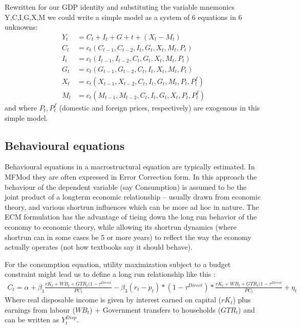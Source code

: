 \documentclass[letterpaper,10pt,english]{jupyterBook}
\begin{document}
\sphinxAtStartPar
Rewritten for our GDP identity and substituting the variable mnemonics Y,C,I,G,X,M we could write a simple model as a system of 6 equations in 6 unknowns:
\begin{align*}
Y_t  &=  C_t+I_t+G+t+ (X_t-M_t) \\
C_t &= c_t(C_{t-1},C_{t-2},I_t,G_t,X_t,M_t,P_t)\\
I_t &= c_t(I_{t-1},I_{t-2},C_t,G_t,X_t,M_t,P_t)\\
G_t &= c_t(G_{t-1},G_{t-2},C_t,I_t,X_t,M_t,P_t)\\
X_t &= c_t(X_{t-1},X_{t-2},C_t,I_t,G_t,M_t,P_t,P^f_t)\\
M_t &= c_t(M_{t-1},M_{t-2},C_t,I_t,G_t,X_t,P_t,P^f_t)
\end{align*}
\sphinxAtStartPar
and where \(P_t, P^f_t\) (domestic and foreign prices, respectively) are exogenous in this simple model.


\subsection{Behavioural equations}
\label{\detokenize{content/02_MacrostructuralModels/MacroStructuralModels:behavioural-equations}}
\sphinxAtStartPar
Behavioural equations in a macrostructural equation are typically estimated. In MFMod they are often expressed in Error Correction form. In this approach the behaviour of the dependent variable (say Consumption) is assumed to be the joint product of a long\sphinxhyphen{}term economic relationship – usually drawn from economic theory, and various short\sphinxhyphen{}run influences which can be more ad hoc in nature. The ECM formulation has the advantage of tieing down the long run behavior of the economy to economic theory, while allowing its short\sphinxhyphen{}run dynamics (where short\sphinxhyphen{}run can in some cases be 5 or more years) to reflect the way the economy actually operates (not how textbooks say it should behave).

\sphinxAtStartPar
For the consumption equation, utility maximization subject to a budget constraint might lead us to define a long run relationship like this :
\begin{equation*}
\begin{split} C_t = \alpha + \beta_1{\frac{rK_t + WB_{t} + GTR_{t}(1-\tau^{Direct}}{PC_t}}-\beta_3(r_t-\dot{p}_t)*(1-\tau^{Direct})*{\frac{rK_t + WB_{t} + GTR_{t}(1-\tau^{Direct}}{PC_t}} +\eta_t\end{split}
\end{equation*}
\sphinxAtStartPar
Where real disposable income is given by interest earned on capital (\(rK_t\)) plus earnings from labour (\(WB_{t}\)) + Government transfers to households (\(GTR_{t}\)) and can be written as \(Y^{Disp}_t\).
\end{document}
